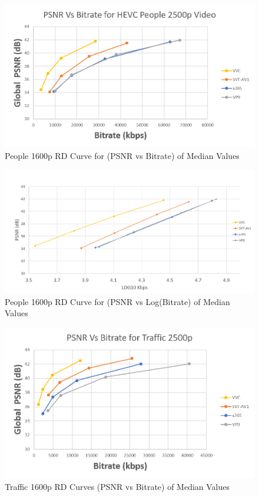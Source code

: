 \documentclass{book}
\begin{document}
\begin{figure}[hbt!]
	\centering
	\includegraphics[width=1.0\linewidth]{pictures/ch7/HEVC-1600p_BD-PSNR-Ppl.png}
	\caption{People 1600p RD Curve for (PSNR vs Bitrate) of Median Values}
\label{fig:HEVC-1600p-PSNR-Ppl}
\end{figure}

\begin{figure}[hbt!]
	\centering
	\includegraphics[width=1.0\linewidth]{pictures/ch7/HEVC-1600p_BD-logPSNR.png}
	\caption{People 1600p RD Curve for (PSNR vs Log(Bitrate) of Median Values}
	\label{fig:HEVC-1600p-logPSNR-Ppl}
\end{figure}

\begin{figure}[hbt!]
	\centering
	\includegraphics[width=1.0\linewidth]{pictures/ch7/HEVC-1600p_BD-PSNR-Traf.png}
	\caption{Traffic 1600p RD Curves (PSNR vs Bitrate) of Median Values}
	\label{fig:HEVC-1600p-PSNR-Traf}
\end{figure}
\end{document}

